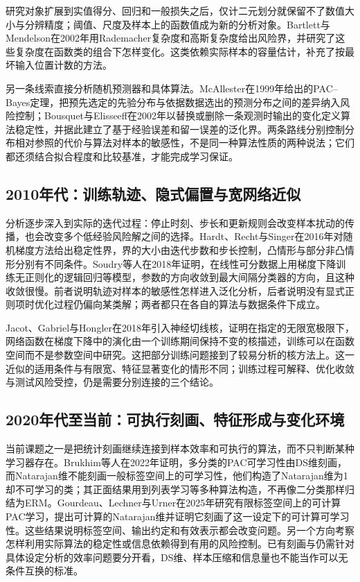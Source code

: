 研究对象扩展到实值得分、回归和一般损失之后，仅计二元划分就保留不了数值大小与分辨精度；阈值、尺度及样本上的函数值成为新的分析对象。Bartlett与Mendelson在2002年用Rademacher复杂度和高斯复杂度给出风险界，并研究了这些复杂度在函数类的组合下怎样变化。这类依赖实际样本的容量估计，补充了按最坏输入位置计数的方法。

另一条线索直接分析随机预测器和具体算法。McAllester在1999年给出的PAC--Bayes定理，把预先选定的先验分布与依据数据选出的预测分布之间的差异纳入风险控制；Bousquet与Elisseeff在2002年以替换或删除一条观测时输出的变化定义算法稳定性，并据此建立了基于经验误差和留一误差的泛化界。两条路线分别控制分布相对参照的代价与算法对样本的敏感性，不是同一种算法性质的两种说法；它们都还须结合拟合程度和比较基准，才能完成学习保证。

\subsection{2010年代：训练轨迹、隐式偏置与宽网络近似}
\label{sec:history-training-dynamics}

分析逐步深入到实际的迭代过程：停止时刻、步长和更新规则会改变样本扰动的传播，也会改变多个低经验风险解之间的选择。Hardt、Recht与Singer在2016年对随机梯度方法给出稳定性界，界的大小由迭代步数和步长控制，凸情形与部分非凸情形分别有不同条件。Soudry等人在2018年证明，在线性可分数据上用梯度下降训练无正则化的逻辑回归等模型，参数的方向收敛到最大间隔分类器的方向，且这种收敛很慢。前者说明轨迹对样本的敏感性怎样进入泛化分析，后者说明没有显式正则项时优化过程仍偏向某类解；两者都只在各自的算法与数据条件下成立。

Jacot、Gabriel与Hongler在2018年引入神经切线核，证明在指定的无限宽极限下，网络函数在梯度下降中的演化由一个训练期间保持不变的核描述，训练可以在函数空间而不是参数空间中研究。这把部分训练问题接到了较易分析的核方法上。这一近似的适用条件与有限宽、特征显著变化的情形不同；训练过程可解释、优化收敛与测试风险受控，仍是需要分别连接的三个结论。

\subsection{2020年代至当前：可执行刻画、特征形成与变化环境}
\label{sec:history-current}

当前课题之一是把统计刻画继续连接到样本效率和可执行的算法，而不只判断某种学习器存在。Brukhim等人在2022年证明，多分类的PAC可学习性由DS维刻画，而Natarajan维不能刻画一般标签空间上的可学习性，他们构造了Natarajan维为1却不可学习的类；其正面结果用到列表学习等多种算法构造，不再像二分类那样归结为ERM。Gourdeau、Lechner与Urner在2025年研究有限标签空间上的可计算PAC学习，提出可计算的Natarajan维并证明它刻画了这一设定下的可计算可学习性。这些结果说明标签空间、输出约定和有效表示都会改变问题。另一个方向考察怎样利用实际算法的稳定性或信息依赖得到有用的风险控制。已有刻画与仍需针对具体设定分析的效率问题要分开看，DS维、样本压缩和信息量也不能当作可以无条件互换的标准。

